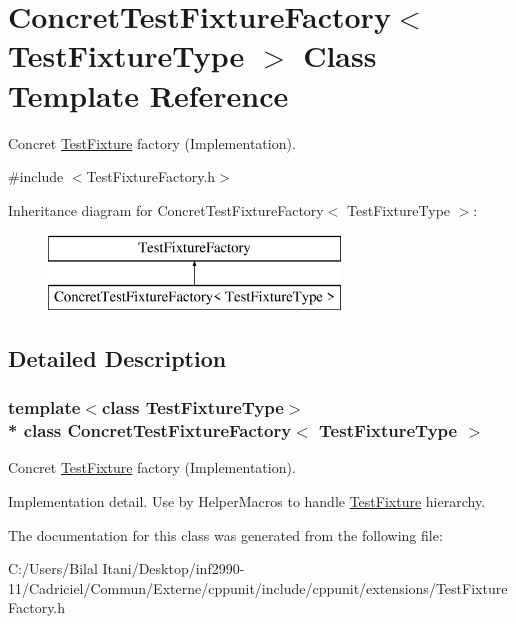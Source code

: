 \hypertarget{class_concret_test_fixture_factory}{}\section{Concret\+Test\+Fixture\+Factory$<$ Test\+Fixture\+Type $>$ Class Template Reference}
\label{class_concret_test_fixture_factory}


Concret \hyperlink{class_test_fixture}{Test\+Fixture} factory (Implementation).  




{\ttfamily \#include $<$Test\+Fixture\+Factory.\+h$>$}

Inheritance diagram for Concret\+Test\+Fixture\+Factory$<$ Test\+Fixture\+Type $>$\+:\begin{figure}[H]
\begin{center}
\leavevmode
\includegraphics[height=2.000000cm]{class_concret_test_fixture_factory}
\end{center}
\end{figure}


\subsection{Detailed Description}
\subsubsection*{template$<$class Test\+Fixture\+Type$>$\\*
class Concret\+Test\+Fixture\+Factory$<$ Test\+Fixture\+Type $>$}

Concret \hyperlink{class_test_fixture}{Test\+Fixture} factory (Implementation). 

Implementation detail. Use by Helper\+Macros to handle \hyperlink{class_test_fixture}{Test\+Fixture} hierarchy. 

The documentation for this class was generated from the following file\+:\begin{DoxyCompactItemize}
\item 
C\+:/\+Users/\+Bilal Itani/\+Desktop/inf2990-\/11/\+Cadriciel/\+Commun/\+Externe/cppunit/include/cppunit/extensions/Test\+Fixture\+Factory.\+h\end{DoxyCompactItemize}
